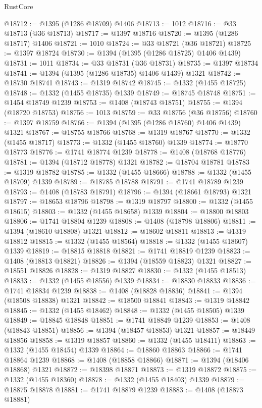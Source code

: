 \begin{lexlean}{RustCore}
\begin{coremodule}
@18712 := @1395 (@1286 @18709) @1406
@18713 := 1012
@18716 := @33 @18713 (@36 @18713)
@18717 := @1397 @18716
@18720 := @1395 (@1286 @18717) @1406
@18721 := 1010
@18724 := @33 @18721 (@36 @18721)
@18725 := @1397 @18724
@18730 := @1394 (@1395 (@1286 @18725) @1406 @1439)
@18731 := 1011
@18734 := @33 @18731 (@36 @18731)
@18735 := @1397 @18734
@18741 := @1394 (@1395 (@1286 @18735) @1406 @1439) @1321
@18742 := @18730 @18741
@18743 := @1319 @18742
@18745 := @1332 (@1455 @18725)
@18748 := @1332 (@1455 @18735) @1339
@18749 := @18745 @18748
@18751 := @1454 @18749 @1239
@18753 := @1408 (@18743 @18751)
@18755 := @1394 (@18720 @18753)
@18756 := 1013
@18759 := @33 @18756 (@36 @18756)
@18760 := @1397 @18759
@18766 := @1394 (@1395 (@1286 @18760) @1406 @1439) @1321
@18767 := @18755 @18766
@18768 := @1319 @18767
@18770 := @1332 (@1455 @18717)
@18773 := @1332 (@1455 @18760) @1339
@18774 := @18770 @18773
@18776 := @1741 @18774 @1239
@18778 := @1408 (@18768 @18776)
@18781 := @1394 (@18712 @18778) @1321
@18782 := @18704 @18781
@18783 := @1319 @18782
@18785 := @1332 (@1455 @18666)
@18788 := @1332 (@1455 @18709) @1339
@18789 := @18785 @18788
@18791 := @1741 @18789 @1239
@18793 := @1408 (@18783 @18791)
@18796 := @1394 (@18661 @18793) @1321
@18797 := @18653 @18796
@18798 := @1319 @18797
@18800 := @1332 (@1455 @18615)
@18803 := @1332 (@1455 @18658) @1339
@18804 := @18800 @18803
@18806 := @1741 @18804 @1239
@18808 := @1408 (@18798 @18806)
@18811 := @1394 (@18610 @18808) @1321
@18812 := @18602 @18811
@18813 := @1319 @18812
@18815 := @1332 (@1455 @18564)
@18818 := @1332 (@1455 @18607) @1339
@18819 := @18815 @18818
@18821 := @1741 @18819 @1239
@18823 := @1408 (@18813 @18821)
@18826 := @1394 (@18559 @18823) @1321
@18827 := @18551 @18826
@18828 := @1319 @18827
@18830 := @1332 (@1455 @18513)
@18833 := @1332 (@1455 @18556) @1339
@18834 := @18830 @18833
@18836 := @1741 @18834 @1239
@18838 := @1408 (@18828 @18836)
@18841 := @1394 (@18508 @18838) @1321
@18842 := @18500 @18841
@18843 := @1319 @18842
@18845 := @1332 (@1455 @18462)
@18848 := @1332 (@1455 @18505) @1339
@18849 := @18845 @18848
@18851 := @1741 @18849 @1239
@18853 := @1408 (@18843 @18851)
@18856 := @1394 (@18457 @18853) @1321
@18857 := @18449 @18856
@18858 := @1319 @18857
@18860 := @1332 (@1455 @18411)
@18863 := @1332 (@1455 @18454) @1339
@18864 := @18860 @18863
@18866 := @1741 @18864 @1239
@18868 := @1408 (@18858 @18866)
@18871 := @1394 (@18406 @18868) @1321
@18872 := @18398 @18871
@18873 := @1319 @18872
@18875 := @1332 (@1455 @18360)
@18878 := @1332 (@1455 @18403) @1339
@18879 := @18875 @18878
@18881 := @1741 @18879 @1239
@18883 := @1408 (@18873 @18881)

\end{coremodule}
\end{lexlean}
